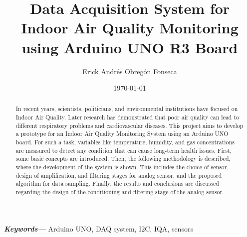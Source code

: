 \documentclass[10pt,a4paper]{article}
\providecommand{\keywords}[1]
{
  \small	
  \textbf{\textit{Keywords---}} #1
}
\begin{document}
\title{Data Acquisition System for Indoor Air Quality Monitoring using Arduino UNO R3 Board}
\author{Erick Andrés Obregón Fonseca}
\date{\today}
\maketitle




\begin{abstract}
\normalsize
In recent years, scientists, politicians, and environmental institutions have focused on Indoor Air Quality. Later research has demonstrated that poor air quality can lead to different respiratory problems and cardiovascular diseases. This project aims to develop a prototype for an Indoor Air Quality Monitoring System using an Arduino UNO board. For such a task, variables like temperature, humidity, and gas concentrations are measured to detect any condition that can cause long-term health issues. First, some basic concepts are introduced. Then, the following methodology is described, where the development of the system is shown. This includes the choice of sensor, design of amplification, and filtering stages for analog sensor, and the proposed algorithm for data sampling. Finally, the results and conclusions are discussed regarding the design of the conditioning and filtering stage of the analog sensor.
\end{abstract}

\keywords{Arduino UNO, DAQ system, I2C, IQA, sensors}

\setcounter{tocdepth}{2}
\tableofcontents


\clearpage






\clearpage

\clearpage
{}

\end{document}
